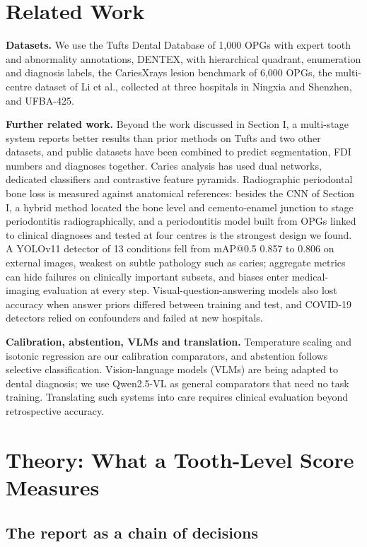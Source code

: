 \documentclass[conference]{IEEEtran}
\begin{document}
\section{Related Work}

\textbf{Datasets.} We use the Tufts Dental Database of 1,000 OPGs with expert tooth and abnormality annotations, DENTEX, with hierarchical quadrant, enumeration and diagnosis labels, the CariesXrays lesion benchmark of 6,000 OPGs, the multi-centre dataset of Li et al., collected at three hospitals in Ningxia and Shenzhen, and UFBA-425.

\textbf{Further related work.} Beyond the work discussed in Section I, a multi-stage system reports better results than prior methods on Tufts and two other datasets, and public datasets have been combined to predict segmentation, FDI numbers and diagnoses together. Caries analysis has used dual networks, dedicated classifiers and contrastive feature pyramids. Radiographic periodontal bone loss is measured against anatomical references: besides the CNN of Section I, a hybrid method located the bone level and cemento-enamel junction to stage periodontitis radiographically, and a periodontitis model built from OPGs linked to clinical diagnoses and tested at four centres is the strongest design we found. A YOLOv11 detector of 13 conditions fell from mAP@0.5 0.857 to 0.806 on external images, weakest on subtle pathology such as caries; aggregate metrics can hide failures on clinically important subsets, and biases enter medical-imaging evaluation at every step. Visual-question-answering models also lost accuracy when answer priors differed between training and test, and COVID-19 detectors relied on confounders and failed at new hospitals.

\textbf{Calibration, abstention, VLMs and translation.} Temperature scaling and isotonic regression are our calibration comparators, and abstention follows selective classification. Vision-language models (VLMs) are being adapted to dental diagnosis; we use Qwen2.5-VL as general comparators that need no task training. Translating such systems into care requires clinical evaluation beyond retrospective accuracy.

\section{Theory: What a Tooth-Level Score Measures}

\subsection{The report as a chain of decisions}
\end{document}
